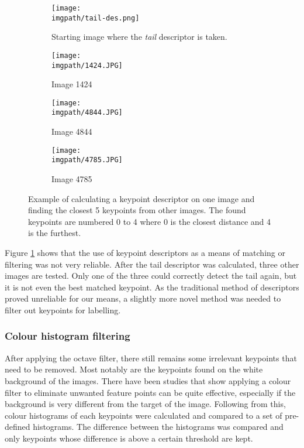 \begin{figure}[H]
\centering
	\begin{subfigure}{0.4\textwidth}
	\texttt{[image: \\imgpath/tail-des.png]}
	\caption{Starting image where the \textit{tail} descriptor is taken.}
	\end{subfigure}
\hspace*{\fill}
	\begin{subfigure}{0.4\textwidth}
	\texttt{[image: \\imgpath/1424.JPG]}
	\caption{Image 1424}
	\end{subfigure}

\vspace{0.5cm}

	\begin{subfigure}{0.4\textwidth}
	\texttt{[image: \\imgpath/4844.JPG]}
	\caption{Image 4844}
	\end{subfigure}
\hspace*{\fill}
	\begin{subfigure}{0.4\textwidth}
	\texttt{[image: \\imgpath/4785.JPG]}
	\caption{Image 4785}
	\end{subfigure}

\caption{Example of calculating a keypoint descriptor on one image and finding the closest 5 keypoints from other images. The found keypoints are numbered 0 to 4 where 0 is the closest distance and 4 is the furthest.}
\label{fig:kpdescriptor}
\end{figure}
\noindent
Figure \ref{fig:kpdescriptor} shows that the use of keypoint descriptors as a means of matching or filtering was not very reliable. After the tail descriptor was calculated, three other images are tested. Only one of the three could correctly detect the tail again, but it is not even the best matched keypoint. As the traditional method of descriptors proved unreliable for our means, a slightly more novel method was needed to filter out keypoints for labelling.




\subsubsection{Colour histogram filtering}
After applying the octave filter, there still remains some irrelevant keypoints that need to be removed. Most notably are the keypoints found on the white background of the images. There have been studies \cite{color-histogram, color-filter} that show applying a colour filter to eliminate unwanted feature points can be quite effective, especially if the background is very different from the target of the image. Following from this, colour histograms of each keypoints were calculated and compared to a set of pre-defined histograms. The difference between the histograms was compared and only keypoints whose difference is above a certain threshold are kept. 

